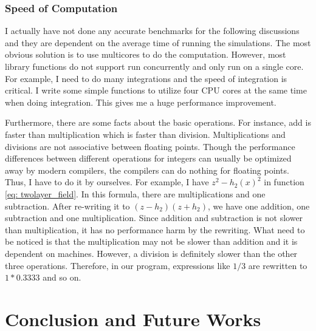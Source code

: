 \documentclass[12pt]{report}
\begin{document}
    \subsection{Speed of Computation}
      I actually have not done any accurate benchmarks for the following discussions and they are 
      dependent on the average time of running the simulations.
      The most obvious solution is to use multicores to do the computation. However, 
      most library functions do not support run concurrently and only run on a single core. 
      For example, I need to do many integrations and the speed of integration is critical. 
      I write some simple functions to utilize four CPU cores at the same time when doing 
      integration. This gives me a huge performance improvement.

      Furthermore, there are some facts about the basic operations. For instance, add is 
      faster than multiplication which is faster than division. Multiplications and divisions 
      are not associative between floating points. Though the performance differences between 
      different operations for integers can usually be optimized away by modern compilers, 
      the compilers can do nothing for floating points. Thus, I have to do it by ourselves. 
      For example, I have $z^2 - h_2\left(x\right)^2$ in function \ref{eq: twolayer_field}.
      In this formula, there are multiplications and one subtraction. After re-writing it to 
      $\left(z-h_2\right)\left(z + h_2\right)$, we have one addition, one subtraction and one 
      multiplication. Since addition and subtraction is not slower than multiplication, it 
      has no performance harm by the rewriting. What need to be noticed is that the 
      multiplication may not be slower than addition
      and it is dependent on machines. However, a division is definitely slower than the other three operations. 
      Therefore, in our program, expressions like $1 / 3$ are rewritten to $1*0.3333$ and so on.  

  
\chapter{Conclusion and Future Works}
\end{document}
